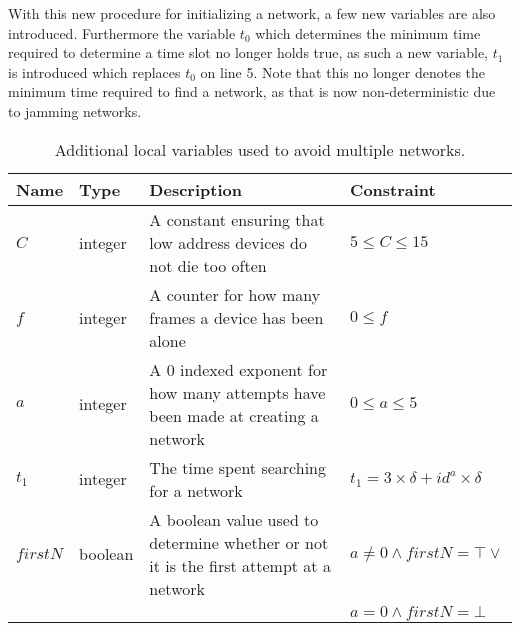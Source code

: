 \bigskip \noindent
With this new procedure for initializing a network, a few new variables are also introduced.
Furthermore the variable $t_0$ which determines the minimum time required to determine a time slot no longer holds true, as such a new variable, $t_1$ is introduced which replaces $t_0$ on  line 5.
Note that this no longer denotes the minimum time required to find a network, as that is now non-deterministic due to jamming networks.
\begin{table}[h]
    {\setlength{\extrarowheight}{1ex}%
    \begin{tabularx}{\textwidth}{l|l|X|l}
        \toprule
        Name                & Type      & Description & Constraint \\
        \midrule
        $C$                 & integer   & A constant ensuring that low address devices do not die too often                 & $5 \leq C \leq 15$      \\
        $f$                 & integer   & A counter for how many frames a device has been alone                             & $0 \leq f$  \\
        $a$                 & integer   & A 0 indexed exponent for how many attempts have been made at creating a network   & $0 \leq a \leq 5$     \\
        $t_1$               & integer   & The time spent searching for a network                                            & $t_1 = 3 \times \delta + id^a \times \delta$     \\
        $firstN$            & boolean   & A boolean value used to determine whether or not it is the first attempt at a network         & $a \neq 0 \land firstN = \top \lor$     \\
                            &           &                                                                                   & $a = 0 \land firstN = \bot$     \\

        \bottomrule
    \end{tabularx}}
    \caption{Additional local variables used to avoid multiple networks.}
    \label{tab:locals_wmulticonnect}
\end{table}